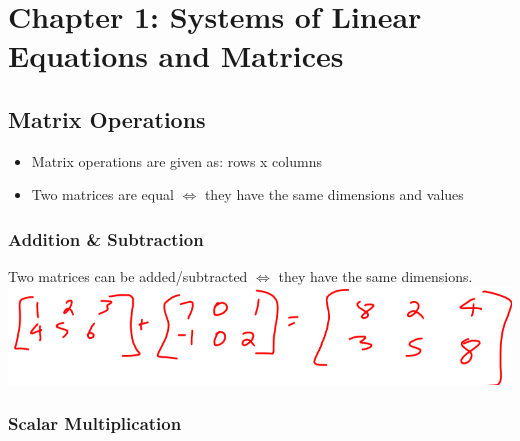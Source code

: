 \documentclass[
  letterpaper,
  DIV=11,
  numbers=noendperiod]{scrartcl}
\author{}
\date{}
\providecommand{\tightlist}{%
  \setlength{\itemsep}{0pt}\setlength{\parskip}{0pt}}\usepackage{longtable,booktabs,array}
\renewcommand*\contentsname{Table of contents}
\newcommand\contentsname{Table of contents}
\begin{document}

\newpage

\ifdefined\Shaded\renewenvironment{Shaded}{\begin{tcolorbox}[interior hidden, boxrule=0pt, breakable, borderline west={3pt}{0pt}{shadecolor}, sharp corners, frame hidden, enhanced]}{\end{tcolorbox}}\fi

\renewcommand*\contentsname{Table of Contents}
{
\hypersetup{linkcolor=}
\setcounter{tocdepth}{4}
\tableofcontents
}
\newpage{}

\hypertarget{chapter-1-systems-of-linear-equations-and-matrices}{%
\section{Chapter 1: Systems of Linear Equations and
Matrices}\label{chapter-1-systems-of-linear-equations-and-matrices}}

\hypertarget{matrix-operations}{%
\subsection{Matrix Operations}\label{matrix-operations}}

\begin{itemize}
\tightlist
\item
  Matrix operations are given as: rows x columns
\item
  Two matrices are equal \(\iff\) they have the same dimensions and
  values
\end{itemize}

\hypertarget{addition-subtraction}{%
\subsubsection{Addition \& Subtraction}\label{addition-subtraction}}

Two matrices can be added/subtracted \(\iff\) they have the same
dimensions. \includegraphics{img/addition-subtraction.png}

\hypertarget{scalar-multiplication}{%
\subsubsection{Scalar Multiplication}\label{scalar-multiplication}}
\end{document}

